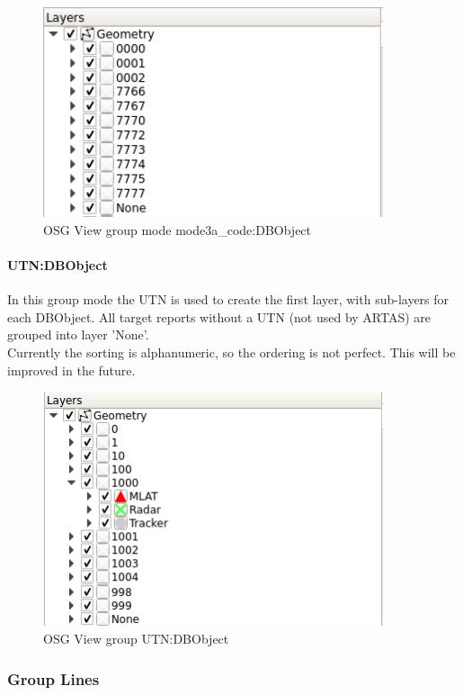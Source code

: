 {\begin{figure}[H]
    \includegraphics[width=10cm,frame]{../screenshots/osgview_group_ma_dbo.png}
  \caption{OSG View group mode mode3a\_code:DBObject}
\end{figure}

\paragraph{UTN:DBObject}

In this group mode the UTN is used to create the first layer, with sub-layers for each DBObject. All target reports without a UTN (not used by ARTAS) are grouped into layer 'None'.  \\

Currently the sorting is alphanumeric, so the ordering is not perfect. This will be improved in the future.

\begin{figure}[H]
    \includegraphics[width=10cm,frame]{../screenshots/osgview_group_utn_dbo.png}
  \caption{OSG View group UTN:DBObject}
\end{figure}

\subsubsection{Group Lines}

}
